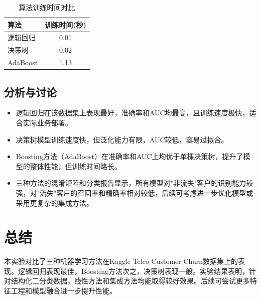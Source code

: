 \documentclass{article}
\begin{document}
\begin{table}[t]
\caption{算法训练时间对比}
\label{tab:training-time}
\begin{center}
\begin{tabular}{@{}lc@{}}
\toprule
\textbf{算法} & \textbf{训练时间(秒)} \\
\midrule
逻辑回归 & 0.01 \\
决策树 & 0.02 \\
AdaBoost & 1.13 \\
\bottomrule
\end{tabular}
\end{center}
\end{table}

\subsection{分析与讨论}
\begin{itemize}
    \item 逻辑回归在该数据集上表现最好，准确率和AUC均最高，且训练速度极快，适合实际业务部署。
    \item 决策树模型训练速度快，但泛化能力有限，AUC较低，容易过拟合。
    \item Boosting方法（AdaBoost）在准确率和AUC上均优于单棵决策树，提升了模型的整体性能，但训练时间略长。
    \item 三种方法的混淆矩阵和分类报告显示，所有模型对"非流失"客户的识别能力较强，对"流失"客户的召回率和精确率相对较低，后续可考虑进一步优化模型或采用更复杂的集成方法。
\end{itemize}

\section{总结}
本实验对比了三种机器学习方法在Kaggle Telco Customer Churn数据集上的表现。逻辑回归表现最佳，Boosting方法次之，决策树表现一般。实验结果表明，针对结构化二分类数据，线性方法和集成方法均能取得较好效果。后续可尝试更多特征工程和模型融合进一步提升性能。



\end{document}

